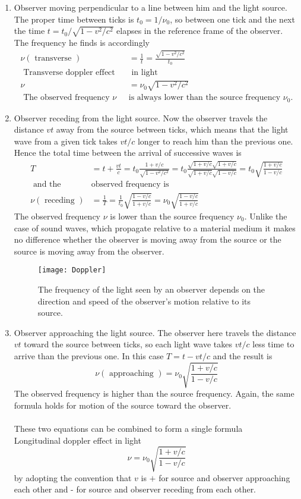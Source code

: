 \begin{enumerate}
	\item  Observer moving perpendicular to a line between him and the light source. The proper time between ticks is $t_{0}=1 / \nu_{0}$, so between one tick and the next the time $t=t_{0} / \sqrt{1-v^{2} / c^{2}}$ elapses in the reference frame of the observer. The frequency he finds is accordingly
	\begin{align*}
	\nu(\text { transverse })&=\frac{1}{t}=\frac{\sqrt{1-v^{2} / c^{2}}}{t_{0}}\\
	\text{	Transverse 	doppler effect}&\text{ 	in light}\\
	\nu&=\nu_{0} \sqrt{1-v^{2} / c^{2}}\\
	\text{	The observed frequency $\nu$ }&\text{is always lower than the source frequency $\nu_{0}$.}
	\end{align*}
	\item  Observer receding from the light source. Now the observer travels the distance $v t$ away from the source between ticks, which means that the light wave from a given tick takes $v t / c$ longer to reach him than the previous one. Hence the total time between the arrival of successive waves is
	\begin{align*}
	T&=t+\frac{v t}{c}=t_{0} \frac{1+v / c}{\sqrt{1-v^{2} / c^{2}}}=t_{0} \frac{\sqrt{1+v / c} \sqrt{1+v / c}}{\sqrt{1+v / c} \sqrt{1-v / c}}=t_{0} \sqrt{\frac{1+v / c}{1-v / c}}\\
\text{	and the }&\text{observed frequency is}\\
	\nu(\text { receding })&=\frac{1}{T}=\frac{1}{t_{0}} \sqrt{\frac{1-v / c}{1+v / c}}=\nu_{0} \sqrt{\frac{1-v / c}{1+v / c}}
	\end{align*}
	The observed frequency $\nu$ is lower than the source frequency $\nu_{0}$. Unlike the case of sound waves, which propagate relative to a material medium it makes no difference whether the observer is moving away from the source or the source is moving away from the observer.
	\begin{figure}[H]
		\centering
		\texttt{[image: Doppler]}
		\caption{ The frequency of the light seen by an observer depends on the direction and speed of the observer's motion relative to its source.}
		\label{}
	\end{figure}
	\item  Observer approaching the light source. The observer here travels the distance $v t$ toward the source between ticks, so each light wave takes $v t / c$ less time to arrive than the previous one. In this case $T=t-v t / c$ and the result is
	$$
	\nu(\text { approaching })=\nu_{0} \sqrt{\frac{1+v / c}{1-v / c}}
	$$
	The observed frequency is higher than the source frequency. Again, the same formula holds for motion of the source toward the observer.\\\\
	These two equations can be combined to form a single formula\\
	Longitudinal doppler
	effect in light
	$$
	\nu=\nu_{0} \sqrt{\frac{1+v / c}{1-v / c}}
	$$
	by adopting the convention that $v$ is $+$ for source and observer approaching each other and - for source and observer receding from each other.
\end{enumerate}
